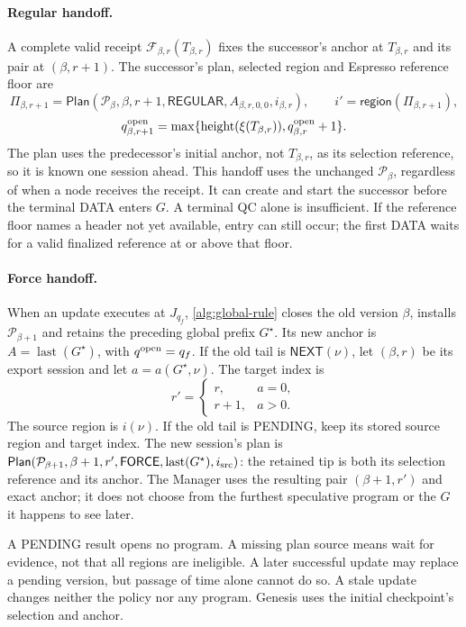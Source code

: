 \documentclass[11pt,a4paper]{article}
\newcommand{\FC}{\mathcal F}
\newcommand{\tagg}[1]{\ensuremath{\mathsf{#1}}}
\begin{document}
\paragraph{Regular handoff.}
A complete valid receipt $\FC_{\beta,r}(T_{\beta,r})$ fixes the
successor's anchor at $T_{\beta,r}$ and its pair at $(\beta,r+1)$.
The successor's plan, selected region and Espresso reference floor are
\[
 \Pi_{\beta,r+1}=\tagg{Plan}(\mathcal P_\beta,\beta,r+1,\tagg{REGULAR},
 A_{\beta,r,0,0},i_{\beta,r}),\qquad
 i'=\tagg{region}(\Pi_{\beta,r+1}),
\]
\[
 q^{\rm open}_{\beta,r+1}
 =\max\{\operatorname{height}(\xi(T_{\beta,r})),
         q^{\rm open}_{\beta,r}+1\}.
\]
The plan uses the predecessor's initial anchor, not $T_{\beta,r}$, as its
selection reference, so it is known one session ahead. This handoff uses
the unchanged $\mathcal P_\beta$, regardless of when a node receives the
receipt.
It can create and start the successor before the terminal DATA enters
$G$. A terminal QC alone is insufficient. If the reference floor names
a header not yet available, entry can still occur; the first DATA waits
for a valid finalized reference at or above that floor.

\paragraph{Force handoff.}
\label{sec:retry-slot}
When an update executes at $J_{q_f}$, \cref{alg:global-rule} closes the
old version $\beta$, installs $\mathcal P_{\beta+1}$ and retains the preceding
global prefix $G^\star$. Its new anchor is
$A=\operatorname{last}(G^\star)$, with $q^{\rm open}=q_f$.
If the old tail is $\tagg{NEXT}(\nu)$, let $(\beta,r)$ be its export
session and let $a=a(G^\star,\nu)$. The target index is
\[
 r'=\begin{cases}
 r,&a=0,\\
 r+1,&a>0.
 \end{cases}
\]
The source region is $i(\nu)$. If the old tail is PENDING, keep its
stored source region and target index. The new session's plan is
$\tagg{Plan}(\mathcal P_{\beta+1},\beta+1,r',\tagg{FORCE},
\operatorname{last}(G^\star),i_{\rm src})$: the retained tip is both its
selection reference and its anchor. The Manager uses the resulting pair
$(\beta+1,r')$ and exact anchor; it does not choose from the furthest
speculative program or the $G$ it happens to see later.

A PENDING result opens no program. A missing plan source means wait for
evidence, not that all regions are ineligible. A later successful update
may replace a pending version, but passage of time alone cannot do so.
A stale update changes neither the policy nor any program.
Genesis uses the initial checkpoint's selection and anchor.
\end{document}
